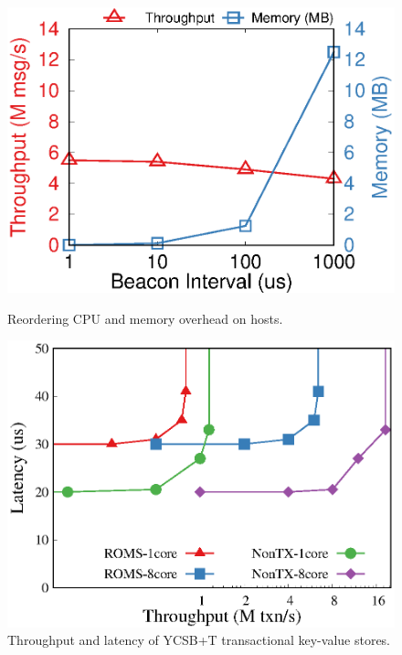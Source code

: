 \iffalse
\begin{figure}[t!]
	\begin{minipage}{.31\textwidth}
    	\centering
		\includegraphics[width=\textwidth]{gnuplot/reorder_receiver.eps}
		\caption{Reordering CPU and memory overhead on hosts.}

	\end{minipage}
    \hspace{0.01\textwidth}
    \begin{minipage}{.31\textwidth}
    	\centering
		\includegraphics[width=\textwidth]{gnuplot/ycsb.eps}
		\caption{Throughput and latency of YCSB+T transactional key-value stores.}
		\label{fig:ycsb}


\end{minipage}
\end{figure}
